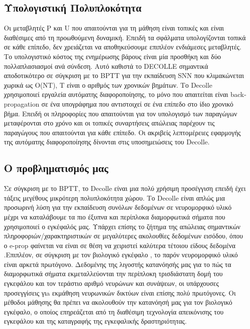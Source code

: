 \documentclass[12pt]{report}
\begin{document}
\subsection{Υπολογιστική Πολυπλοκότητα}
Οι μεταβλητές \textlatin{P} και \textlatin{U} που απαιτούνται για τη μάθηση είναι τοπικές και είναι διαθέσιμες από τη  προωθούμενη δυναμική. Επειδή τα σφάλματα υπολογίζονται τοπικά σε κάθε επίπεδο, δεν χρειάζεται να αποθηκεύσουμε επιπλέον ενδιάμεσες μεταβλητές. Το υπολογιστικό κόστος της ενημέρωσης βάρους είναι μία προσθήκη και δύο πολλαπλασιασμοί ανά σύνδεση. Αυτό καθιστά το \textlatin{DECOLLE} σημαντικά αποδοτικότερο σε σύγκριση με το \textlatin{BPTT} για την εκπαίδευση \textlatin{SNN} που κλιμακώνεται χωρικά ως O(NT), T είναι ο αριθμός των χρονικών βημάτων. Το \textlatin{Decolle} χρησιμοποιεί εργαλεία αυτόματης διαφοροποίησης, το μόνο που απαιτείται είναι \textlatin{backpropagation} σε ένα υπογράφημα που αντιστοιχεί σε ένα επίπεδο στο ίδιο χρονικό βήμα. Επειδή οι πληροφορίες που απαιτούνται για τον υπολογισμό των παραγώγων μεταφέρονται στο χρόνο και οι τοπικές συναρτήσεις απώλειας παρέχουν τις παραγώγους που απαιτούνται για κάθε επίπεδο. Οι ακριβείς λεπτομέρειες εφαρμογής της αυτόματης διαφοροποίησης δίνονται στις υποσημειώσεις του \textlatin{Decolle}.

\subsection{Ο προβληματισμός μας}
Σε σύγκριση με το \textlatin{BPTT}, το \textlatin{Decolle } είναι μια πολύ χρήσιμη προσέγγιση επειδή έχει τάξεις μεγέθους μικρότερη πολυπλοκότητα χώρου. Το \textlatin{Decolle} είναι απλώς μια προσωρινή λύση για την εκπαίδευση συνόλων δεδομένων σε νευρομορφικό υλικό μέχρι να καταλάβουμε τα πιο έξυπνα και περίπλοκα διαμορφωτικά σήματα που χρησιμοποιεί ο εγκέφαλός μας. Υπάρχει επίσης το ζήτημα της απώλειας σημαντικών πληροφοριών/χαρακτηριστικών σε μεγαλύτερες ακολουθίες δεδομένων εισόδου, όπου ο \textlatin{e-prop } φαίνεται να είναι σε θέση να χειριστεί καλύτερα τέτοιου είδους δεδομένα .Επιπλέον, σε σύγκριση με τον βιολογικό εγκέφαλο , το παρόν νευρομορφικό υλικό είναι αρκετά πρωτόγονο. Δεδομένης της λιγοστής κατανόησής μας για το πώς τα διαμορφωτικά σήματα εκμεταλλεύονται την περίπλοκη τρισδιάστατη δομή του εγκεφάλου και τον τεράστιο αριθμό νευρώνων και συνάψεων, οι υπάρχουσες προσεγγίσεις γιa εκμάθηση νευρωνικών δικτύων είναι επίσης πολύ πρωτόγονες. Οι μέθοδοι μάθησης θα πρέπει να ακολουθούν την κατανόησή μας για τον βιολογικό εγκέφαλο, ο οποίος επηρεάζεται από τη διαθέσιμη τεχνολογία απεικόνισης του εγκεφάλου και της καταγραφής της εγκεφαλικής δραστηριότητας.
\end{document}
